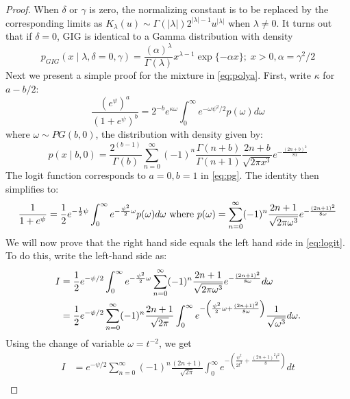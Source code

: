 \documentclass[letterpaper,11pt]{article}
\begin{document}
\begin{proof}
When $\delta$ or $\gamma$ is zero, the normalizing constant is to be replaced by the corresponding limits as $K_{\lambda}(u) \sim \Gamma(|\lambda|)2^{|\lambda|-1} u^{|\lambda|}$ when $\lambda \neq 0$. It turns out that if $\delta=0$, GIG is identical to a Gamma distribution with density 
$$
p_{GIG}(x \mid \lambda, \delta = 0 , \gamma) = \frac{(\alpha)^{\lambda}}{\Gamma(\lambda)} x^{\lambda-1} \exp\{ -\alpha x \}; \; x > 0, \alpha = \gamma^2 / 2 
$$
%
Next we present a simple proof for the \PG mixture in \eqref{eq:polya}. First, write $\kappa$ for $a-b/2$: 
\begin{equation}
  \frac{(e^{\psi})^a}{(1+e^{\psi})^b} = 2^{-b} e^{\kappa \omega} \int_0^{\infty} e^{-\omega \psi^2/2} p(\omega) d\omega \label{eq:pg}
\end{equation}
where $\omega \sim PG(b,0)$, the \PG distribution with density given by: 
$$
p(x \mid b, 0) = \frac{2^{(b-1)}}{\Gamma(b)} \sum_{n=0}^{\infty} (-1)^n \frac{\Gamma(n+b)}{\Gamma(n+1)} \frac{2n+b}{\sqrt{2\pi x^3}} e^{-\frac{(2n+b)^2}{8x}} 
$$
The logit function corresponds to $a=0,b=1$ in \eqref{eq:pg}. The \CS identity then simplifies to:  
\begin{equation}
  \frac{1}{1+e^{\psi}} = \frac{1}{2} e^{-\frac{1}{2} \psi} \int_0^{\infty} e^{-\frac{\psi^2}{2} \omega} p(\omega) d\omega 
  \text{ where } p(\omega) = \sum_{n=0}^{\infty} (-1)^n \frac{2n+1}{\sqrt{2\pi \omega^3}} e^{-\frac{(2n+1)^2}{8\omega}}
  \label{eq:logit}
\end{equation}
We will now prove that the right hand side equals the left hand side in \eqref{eq:logit}. To do this, write the left-hand side as:
\begin{align*}
I & = \frac{1}{2} e^{-\psi/2} \int_0^{\infty} e^{-\frac{\psi^2}{2} \omega} \sum_{n=0}^{\infty} (-1)^n \frac{2n+1}{\sqrt{2\pi \omega^3}} e^{-\frac{(2n+1)^2}{8\omega}}d \omega \\
& = \frac{1}{2} e^{-\psi/2}  \sum_{n=0}^{\infty} (-1)^n \frac{2n+1}{\sqrt{2\pi}} \int_0^{\infty} e^{- \left( \frac{\psi^2}{2}  \omega + \frac{(2n+1)^2}{8\omega} \right) } \frac{1}{\sqrt{ \omega^3}} d\omega. 
\end{align*}
Using the change of variable $\omega = t^{-2}$, we get 
\begin{align*}
I & = e^{-\psi/2}  \sum_{n=0}^{\infty} (-1)^n \frac{(2n+1)}{\sqrt{2\pi}} \int_{0}^{\infty} e^{-\left( \frac{\psi^2}{2t^2} + \frac{(2n+1)^2 t^2}{8} \right)} d t \\

\end{align*}
\end{proof}
\end{document}
